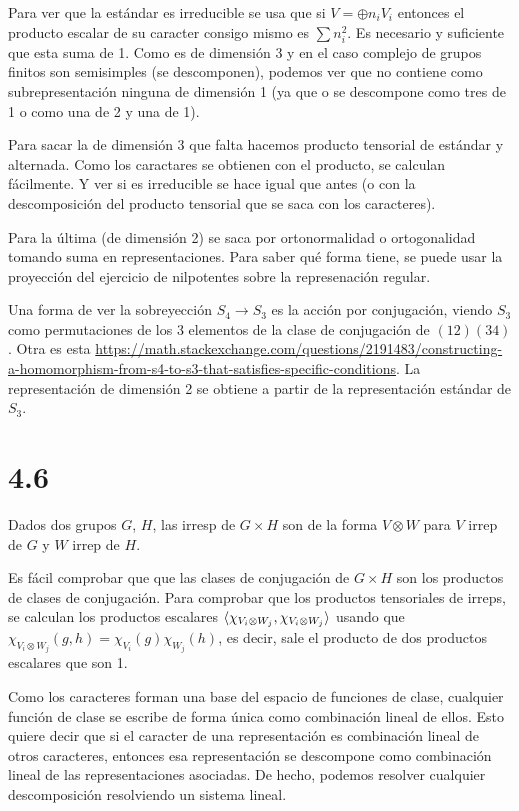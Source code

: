 \documentclass[ANAyTR.tex]{subfiles}
\begin{document}
Para ver que la estándar es irreducible se usa que si $V=\oplus n_i V_i$ entonces el producto escalar de su caracter consigo mismo es $\sum n_i^2$. Es necesario y suficiente que esta suma de 1. Como es de dimensión 3 y en el caso complejo de grupos finitos son semisimples (se descomponen), podemos ver que no contiene como subrepresentación ninguna de dimensión 1 (ya que o se descompone como tres de 1 o como una de 2 y una de 1).

Para sacar la de dimensión 3 que falta hacemos producto tensorial de estándar y alternada. Como los caractares se obtienen con el producto, se calculan fácilmente. Y ver si es irreducible se hace igual que antes (o con la descomposición del producto tensorial que se saca con los caracteres).

Para la última (de dimensión 2) se saca por ortonormalidad o ortogonalidad tomando suma en representaciones. Para saber qué forma tiene, se puede usar la proyección del ejercicio de nilpotentes sobre la represenación regular.  


Una forma de ver la sobreyección $S_4\to S_3$ es la acción por conjugación, viendo $S_3$ como permutaciones de los 3 elementos de la clase de conjugación de $(12)(34)$. Otra es esta \url{https://math.stackexchange.com/questions/2191483/constructing-a-homomorphism-from-s4-to-s3-that-satisfies-specific-conditions}. La representación de dimensión 2 se obtiene a partir de la representación estándar de $S_3$. 


\section{4.6}

Dados dos grupos $G$, $H$, las irresp de $G\times H$ son de la forma $V\otimes W$ para $V$ irrep de $G$ y $W$ irrep de $H$.

Es fácil comprobar que que las clases de conjugación de $G\times H$ son los productos de clases de conjugación.  Para comprobar que los productos tensoriales de irreps, se calculan los productos escalares $\langle{\chi_{V_i\otimes W_j},\chi_{V_i\otimes W_j}}\rangle$ usando que $\chi_{V_i\otimes W_j}(g,h)=\chi_{V_i}(g)\chi_{W_j}(h)$, es decir, sale el producto de dos productos escalares que son 1. 

Como los caracteres forman una base del espacio de funciones de clase, cualquier función de clase se escribe de forma única como combinación lineal de ellos. Esto quiere decir que si el caracter de una representación es combinación lineal de otros caracteres, entonces esa representación se descompone como combinación lineal de las representaciones asociadas. De hecho, podemos resolver cualquier descomposición resolviendo un sistema lineal. 
\end{document}
